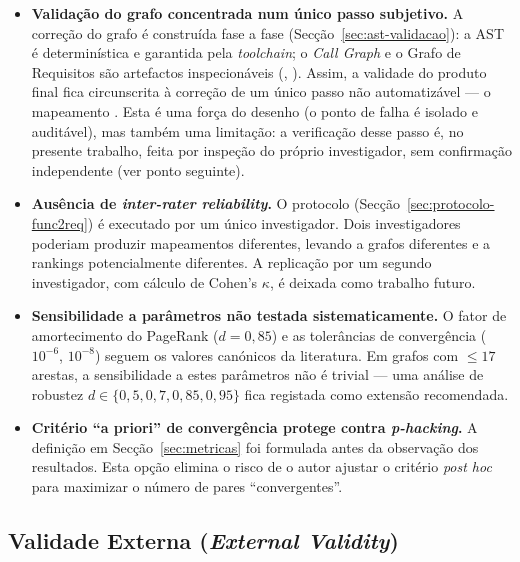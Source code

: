 \begin{itemize}
    \item \textbf{Validação do grafo concentrada num único passo
        subjetivo.} A correção do grafo é construída fase a fase
        (Secção~\ref{sec:ast-validacao}): a AST é determinística e
        garantida pela \emph{toolchain}; o \emph{Call Graph} e o Grafo
        de Requisitos são artefactos inspecionáveis
        (, ). Assim, a
        validade do produto final fica circunscrita à correção de um
        único passo não automatizável --- o mapeamento
        . Esta é uma força do desenho (o ponto de
        falha é isolado e auditável), mas também uma limitação: a
        verificação desse passo é, no presente trabalho, feita por
        inspeção do próprio investigador, sem confirmação independente
        (ver ponto seguinte).

    \item \textbf{Ausência de \emph{inter-rater reliability}.} O
        protocolo 
        (Secção~\ref{sec:protocolo-func2req}) é executado por um
        único investigador. Dois investigadores poderiam produzir
        mapeamentos diferentes, levando a grafos diferentes e a
        rankings potencialmente diferentes. A replicação por um
        segundo investigador, com cálculo de Cohen's $\kappa$, é
        deixada como trabalho futuro.

    \item \textbf{Sensibilidade a parâmetros não testada
        sistematicamente.} O fator de amortecimento do PageRank
        ($d = 0{,}85$) e as tolerâncias de convergência ($10^{-6}$,
        $10^{-8}$) seguem os valores canónicos da literatura. Em
        grafos com $\leq 17$ arestas, a sensibilidade a estes
        parâmetros não é trivial --- uma análise de robustez
        $d \in \{0{,}5, 0{,}7, 0{,}85, 0{,}95\}$ fica registada como
        extensão recomendada.

    \item \textbf{Critério ``a priori'' de convergência protege
        contra \emph{p-hacking}.} A definição em
        Secção~\ref{sec:metricas} foi formulada antes da observação
        dos resultados. Esta opção elimina o risco de o autor
        ajustar o critério \emph{post hoc} para maximizar o número
        de pares ``convergentes''.
\end{itemize}

\subsection{Validade Externa (\emph{External Validity})}

